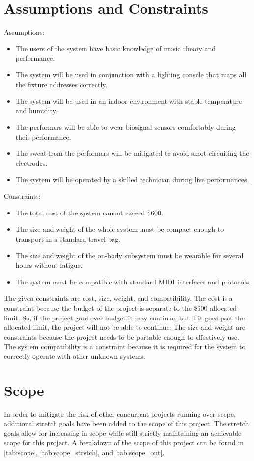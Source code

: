 \section{Assumptions and Constraints}
Assumptions:
\begin{itemize}
    \item The users of the system have basic knowledge of music theory and performance.
    \item The system will be used in conjunction with a lighting console that maps all the fixture addresses correctly.
    \item The system will be used in an indoor environment with stable temperature and humidity.
    \item The performers will be able to wear biosignal sensors comfortably during their performance.
    \item The sweat from the performers will be mitigated to avoid short-circuiting the electrodes.
    \item The system will be operated by a skilled technician during live performances.
\end{itemize}

Constraints:
\begin{itemize}
    \item The total cost of the system cannot exceed \$600.
    \item The size and weight of the whole system must be compact enough to transport in a standard travel bag.
    \item The size and weight of the on-body subsystem must be wearable for several hours without fatigue.
    \item The system must be compatible with standard MIDI interfaces and protocols.
\end{itemize}

The given constraints are cost, size, weight, and compatibility.
The cost is a constraint because the budget of the project is separate to the \$600 allocated limit.
So, if the project goes over budget it may continue, but if it goes past the allocated limit, the project will not be able to continue.
The size and weight are constraints because the project needs to be portable enough to effectively use.
The system compatibility is a constraint because it is required for the system to correctly operate with other unknown systems.

\section{Scope}
In order to mitigate the risk of other concurrent projects running over scope, additional stretch goals have
been added to the scope of this project. The stretch goals allow for increasing in scope
while still strictly maintaining an achievable scope for this project.
A breakdown of the scope of this project can be found in \autoref{tab:scope}, \autoref{tab:scope_stretch}, and \autoref{tab:scope_out}.

